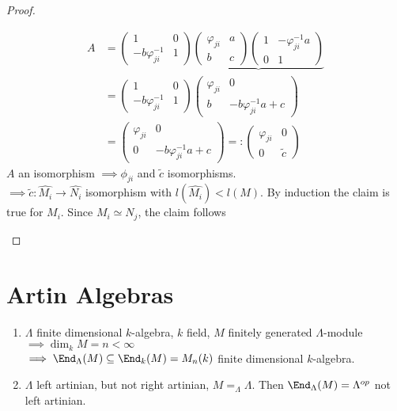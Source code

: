\begin{thm}
\begin{proof}
\begin{enumerate}
\begin{enumerate}
\[
\begin{matrix}
A &= \begin{pmatrix}
1 & 0\\ 
-b\varphi_{ji}^{-1} & 1
\end{pmatrix}
\underbrace{\begin{pmatrix}
\varphi_{ji} & a\\b&c
\end{pmatrix}\begin{pmatrix}
 1 & -\varphi_{ji}^{-1}a\\ 0 & 1
\end{pmatrix}}\\
&= \begin{pmatrix}
1 & 0\\ 
-b\varphi_{ji}^{-1} & 1
\end{pmatrix}
\begin{pmatrix}
\varphi_{ji} & 0\\b & -b\varphi_{ji}^{-1}a + c
\end{pmatrix}\\
&= 
\begin{pmatrix}
\varphi_{ji} & 0\\0 & -b\varphi_{ji}^{-1}a + c 
\end{pmatrix} =:
\begin{pmatrix}
\varphi_{ji} & 0\\0 & \tilde{c}
\end{pmatrix}
\end{matrix}
\]
$A$ an isomorphism $\implies \phi_{ji}$ and $\tilde{c}$ isomorphisms.\\
$\implies \tilde{c}: \hat{M_i} \to \hat{N_i}$ isomorphism with $l(\hat{M_i}) < l(M)$. By induction the claim is true for $M_i$. Since $M_i \simeq N_j$, the claim follows 
\end{enumerate}
\end{enumerate}
\end{proof}
\end{thm}


\section{Artin Algebras}
\begin{recall}
\begin{enumerate}
\item $\Lambda$ finite dimensional $k$-algebra, $k$ field, $M$ finitely generated $\Lambda$-module $\implies \dim_k M = n < \infty$\\
$\implies \End_\Lambda(M) \subseteq \End_k(M) = M_n(k)$ finite dimensional $k$-algebra.

\item $\Lambda$ left artinian, but not right artinian, $M = _\Lambda\Lambda$. Then $\End_\Lambda(M) = \Lambda^{op}$ not left artinian. 
\end{enumerate}
\end{recall}

